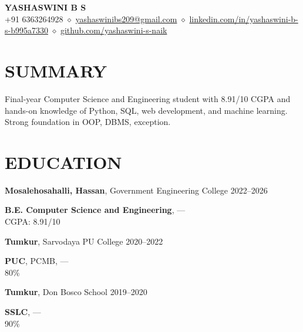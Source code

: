 \documentclass[8.5pt,a4paper]{extarticle}
\begin{document}
\begin{center}
{\large \textbf{YASHASWINI B S}} \\ \vspace{1pt}
{\footnotesize +91 6363264928 $\diamond$ \href{mailto:yashaswinibs209@gmail.com}{yashaswinibs209@gmail.com} $\diamond$ \href{https://linkedin.com/in/yashaswini-b-s-b995a7330}{linkedin.com/in/yashaswini-b-s-b995a7330} $\diamond$ \href{https://github.com/yashaswini-s-naik}{github.com/yashaswini-s-naik}}
\end{center}

\section*{SUMMARY}
{\small Final-year Computer Science and Engineering student with 8.91/10 CGPA and hands-on knowledge of Python, SQL, web development, and machine learning. Strong foundation in OOP, DBMS, exception.}

\section*{EDUCATION}
{\small \noindent \textbf{Mosalehosahalli, Hassan}, Government Engineering College \hfill 2022–2026 \\ \vspace{4pt}

\noindent \textbf{B.E. Computer Science and Engineering}, — \\
\null \hfill CGPA: 8.91/10 \vspace{4pt}

\noindent \textbf{Tumkur}, Sarvodaya PU College \hfill 2020–2022 \\ \vspace{4pt}

\noindent \textbf{PUC}, PCMB, — \\
\null \hfill 80\% \vspace{4pt}

\noindent \textbf{Tumkur}, Don Bosco School \hfill 2019–2020 \\ \vspace{4pt}

\noindent \textbf{SSLC}, — \\
\null \hfill 90\% \vspace{4pt}

}
\end{document}

